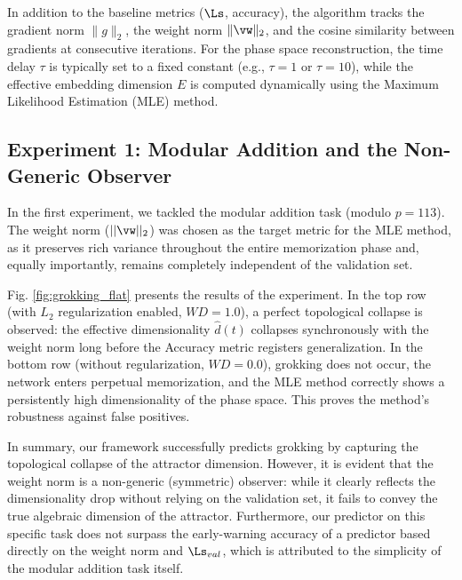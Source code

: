 \documentclass{article}
\begin{document}
In addition to the baseline metrics ($\Ls$, accuracy), the algorithm tracks the gradient norm $\|g\|_2$, the weight norm $\|\vw\|_2$, and the cosine similarity between gradients at consecutive iterations. For the phase space reconstruction, the time delay $\tau$ is typically set to a fixed constant (e.g., $\tau=1$ or $\tau=10$), while the effective embedding dimension $E$ is computed dynamically using the Maximum Likelihood Estimation (MLE) method.

\subsection{Experiment 1: Modular Addition and the Non-Generic Observer}\label{sec:exp_mod}

In the first experiment, we tackled the modular addition task (modulo $p=113$). The weight norm ($||\vw||_2$) was chosen as the target metric for the MLE method, as it preserves rich variance throughout the entire memorization phase and, equally importantly, remains completely independent of the validation set.

Fig. \ref{fig:grokking_flat} presents the results of the experiment. In the top row (with $L_2$ regularization enabled, $WD=1.0$), a perfect topological collapse is observed: the effective dimensionality $\hat{d}(t)$ collapses synchronously with the weight norm long before the Accuracy metric registers generalization. In the bottom row (without regularization, $WD=0.0$), grokking does not occur, the network enters perpetual memorization, and the MLE method correctly shows a persistently high dimensionality of the phase space. This proves the method's robustness against false positives.

In summary, our framework successfully predicts grokking by capturing the topological collapse of the attractor dimension. However, it is evident that the weight norm is a non-generic (symmetric) observer: while it clearly reflects the dimensionality drop without relying on the validation set, it fails to convey the true algebraic dimension of the attractor. Furthermore, our predictor on this specific task does not surpass the early-warning accuracy of a predictor based directly on the weight norm and $\Ls_{val}$, which is attributed to the simplicity of the modular addition task itself.
\end{document}
